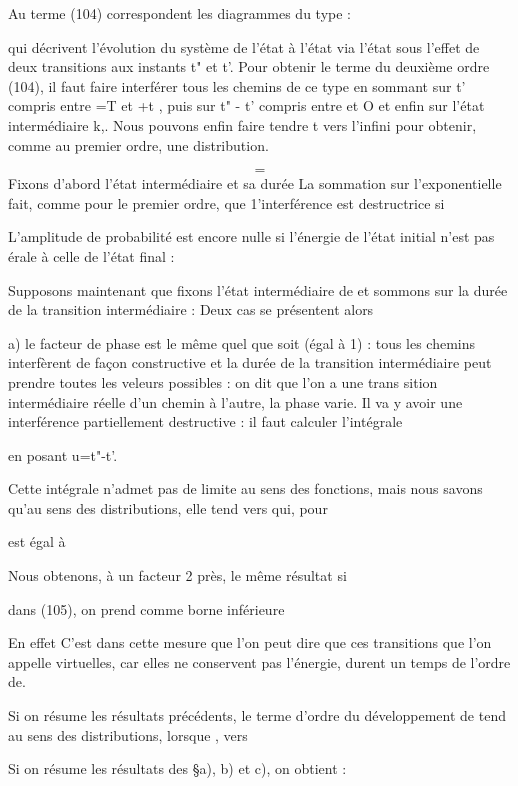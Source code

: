 {{{Au terme (104) correspondent les diagrammes du type :

qui décrivent l'évolution du système de l'état  à l'état
 via l'état  sous l'effet de deux transitions aux
instants t" et t'. Pour obtenir le terme du deuxième ordre (104),
il faut faire interférer tous les chemins de ce type en sommant
sur t' compris entre =T et +t , puis sur t" - t' compris entre
 et O et enfin sur l'état intermédiaire k,. Nous pouvons enfin
faire tendre t vers l'infini pour obtenir, comme au premier ordre,
une distribution.


\[
\tag{(105)}=
\]
Fixons d'abord l'état intermédiaire  et sa durée
La sommation sur l'exponentielle  fait, comme
pour le premier ordre, que 1'interférence est destructrice si

L'amplitude de probabilité est encore nulle si l'énergie de l'état
initial n'est pas érale à celle de l'état final :

Supposons maintenant que  fixons l'état intermédiaire  de
et sommons sur la durée de la transition intermédiaire  : Deux
cas se présentent alors

a) le facteur de phase est le même quel que soit
(égal à 1) : tous les chemins interfèrent de façon constructive et la durée
de la transition intermédiaire peut prendre toutes les veleurs possibles :
on dit que l'on a une trans sition intermédiaire réelle
d'un chemin à l'autre, la phase varie. Il va y avoir une
interférence partiellement destructive : il faut calculer l'intégrale

en posant u=t"-t'.

Cette intégrale n'admet pas de limite au sens des fonctions, mais nous savons
qu'au sens des distributions, elle tend vers  qui, pour

 est égal à 


Nous obtenons, à un facteur 2 près, le même résultat si

dans  (105), on prend comme borne inférieure

En effet
C'est dans cette mesure que l'on peut dire que ces transitions
que l'on appelle virtuelles, car elles ne conservent pas l'énergie, durent un temps de l'ordre de.

 

Si on résume les résultats précédents, le terme d'ordre
 du développement de  tend au sens des distributions, lorsque , vers

Si on résume les résultats des \S a), b) et c), on obtient :

}}}

